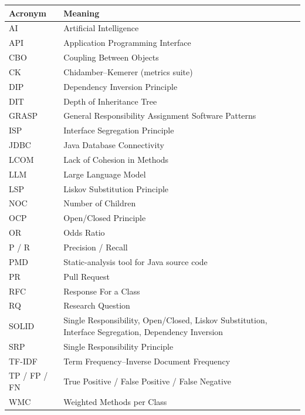 
\begin{longtable}{@{}L{3.1cm}L{11.5cm}@{}}
\toprule
\textbf{Acronym} & \textbf{Meaning} \\
\midrule
\endhead
AI & Artificial Intelligence \\
API & Application Programming Interface \\
CBO & Coupling Between Objects \\
CK & Chidamber--Kemerer (metrics suite) \\
DIP & Dependency Inversion Principle \\
DIT & Depth of Inheritance Tree \\
GRASP & General Responsibility Assignment Software Patterns \\
ISP & Interface Segregation Principle \\
JDBC & Java Database Connectivity \\
LCOM & Lack of Cohesion in Methods \\
LLM & Large Language Model \\
LSP & Liskov Substitution Principle \\
NOC & Number of Children \\
OCP & Open/Closed Principle \\
OR & Odds Ratio \\
P / R & Precision / Recall \\
PMD & Static-analysis tool for Java source code \\
PR & Pull Request \\
RFC & Response For a Class \\
RQ & Research Question \\
SOLID & Single Responsibility, Open/Closed, Liskov Substitution, Interface Segregation, Dependency Inversion \\
SRP & Single Responsibility Principle \\
TF-IDF & Term Frequency--Inverse Document Frequency \\
TP / FP / FN & True Positive / False Positive / False Negative \\
WMC & Weighted Methods per Class \\
\bottomrule
\end{longtable}
